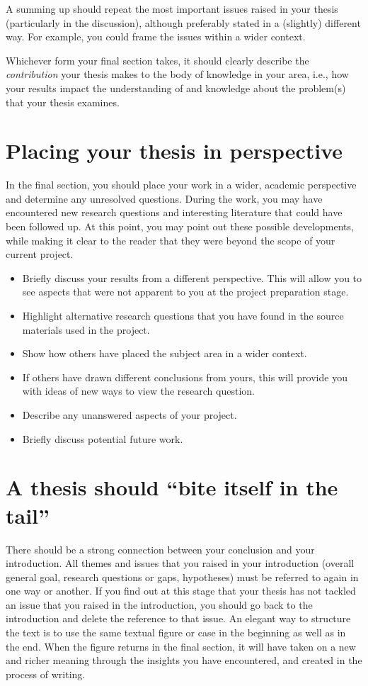 \documentclass[a4paper,twoside]{bth}
\begin{document}
A summing up should repeat the most important issues raised in your thesis (particularly in the discussion), although preferably stated in a (slightly) different way. For example, you could frame the issues within a wider context.

Whichever form your final section takes, it should clearly describe the \emph{contribution} your thesis makes to the body of knowledge in your area, i.e., how your results impact the understanding of and knowledge about the problem(s) that your thesis examines.


\section{Placing your thesis in perspective}
In the final section, you should place your work in a wider, academic perspective and determine any unresolved questions. During the work, you may have encountered new research questions and interesting literature that could have been followed up. At this point, you may point out these possible developments, while making it clear to the reader that they were beyond the scope of your current project.

\begin{itemize}
    \item Briefly discuss your results from a different perspective. This will allow you to see aspects that were not apparent to you at the project preparation stage.
    \item Highlight alternative research questions that you have found in the source materials used in the project.
    \item Show how others have placed the subject area in a wider context.
    \item If others have drawn different conclusions from yours, this will provide you with ideas of new ways to view the research question.
    \item Describe any unanswered aspects of your project.
    \item Briefly discuss potential future work. 
\end{itemize}

    
\section{A thesis should ``bite itself in the tail''}
There should be a strong connection between your conclusion and your introduction. All themes and issues that you raised in your introduction (overall general goal, research questions or gaps, hypotheses) must be referred to again in one way or another. If you find out at this stage that your thesis has not tackled an issue that you raised in the introduction, you should go back to the introduction and delete the reference to that issue. An elegant way to structure the text is to use the same textual figure or case in the beginning as well as in the end. When the figure returns in the final section, it will have taken on a new and richer meaning through the insights you have encountered, and created in the process of writing.
\end{document}
